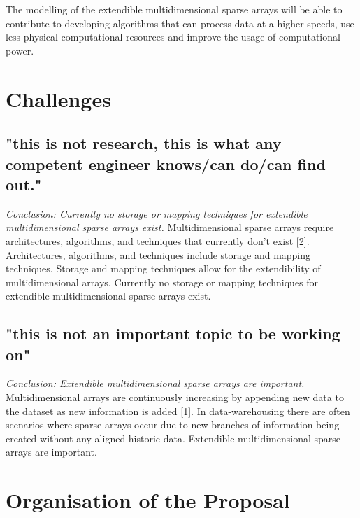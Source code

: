 The modelling of the extendible multidimensional sparse arrays will be able to contribute to developing algorithms that can process data at a higher speeds, use less physical computational resources and improve the usage of computational power.
\section{Challenges}
\subsection{"this is not research, this is what any competent engineer knows/can do/can find out."}
\textit{Conclusion: Currently no storage or mapping techniques for extendible multidimensional sparse arrays exist.}
\newline
\newline
Multidimensional sparse arrays require architectures, algorithms, and techniques that currently don't exist [2].
\newline
Architectures, algorithms, and techniques include storage and mapping techniques.
\newline
Storage and mapping techniques allow for the extendibility of multidimensional arrays.
\newline
Currently no storage or mapping techniques for extendible multidimensional sparse arrays exist.
\subsection{"this is not an important topic to be working on"}
\textit{Conclusion: Extendible multidimensional sparse arrays are important.}
\newline
\newline
Multidimensional arrays are continuously increasing by appending new data to the dataset as new information is added [1].
\newline
In data-warehousing there are often scenarios where sparse arrays occur due to new branches of information being created without any aligned historic data.
\newline
Extendible multidimensional sparse arrays are important.

\section{Organisation of the Proposal}%

